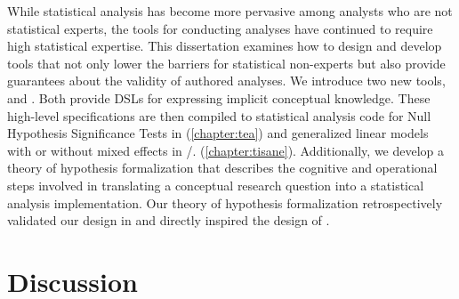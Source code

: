 
While statistical analysis has become more pervasive among analysts who are not
statistical experts, the tools for conducting analyses have continued to require
high statistical expertise. This dissertation examines how to design and develop
tools that not only lower the barriers for statistical non-experts but also
provide guarantees about the validity of authored analyses. We introduce two new
tools, \tea and \tisane. Both provide DSLs for expressing implicit conceptual
knowledge. These high-level specifications are then compiled to statistical
analysis code for Null Hypothesis Significance Tests in \tea (\autoref{chapter:tea}) and
generalized linear models with or without mixed effects in \tisane/\rTisane.
(\autoref{chapter:tisane}). 
Additionally, we develop a theory of hypothesis formalization that describes the
cognitive and operational steps involved in translating a conceptual research
question into a statistical analysis implementation. Our theory of hypothesis
formalization retrospectively validated our design in \tea and directly inspired
the design of \tisane. 


\section{Discussion} \label{sec:discussionChallenges} 


